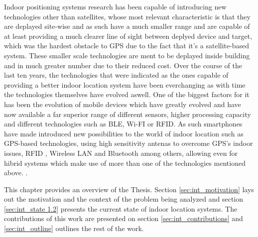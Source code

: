 Indoor positioning systems research has been capable of introducing new technologies other than satellites, whose most relevant characteristic is that they are deplayed site-wise and as such have a much smaller range and are capable of at least providing a much clearer line of sight between deplyed device and target, which was the hardest obstacle to \ac{GPS} due to the fact that it's a satellite-based system. These smaller scale technologies are ment to be deplayed inside building and in much greater number due to their reduced cost. Over the course of the last ten years, the technologies that  were indicated as the ones capable of providing a better indoor location system have been everchanging as with time the technologies themselves have evolved aswell. One of the biggest factors for it has been the evolution of mobile devices which have greatly evolved and have now available a far superior range of different sensors, higher processing capacity and different technologies such as \ac{BLE}, Wi-FI or \ac{RFID}. As such smartphones have made introduced new possibilities to the world of indoor location such as GPS-based technologies, using high sensitivity antenas to overcome GPS's indoor issues, \ac{RFID} , Wireless \ac{LAN} and Bluetooth among others, allowing even for hibrid systems which make use of more than one of the technologies mentioned above. \cite{surveywireless,survey2,survey1}.

This chapter provides an overview of the Thesis. Section \ref{sec:int_motivation} lays out the motivation and the context of the problem being analyzed and section \ref{sec:int_state 1.2} presents the current state of indoor location systems. The contributions of this work are presented on section \ref{sec:int_contributions} and \ref{sec:int_outline} outlines the rest of the work.






\cleardoublepage